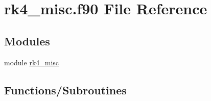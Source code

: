 \hypertarget{rk4__misc_8f90}{}\section{rk4\+\_\+misc.\+f90 File Reference}
\label{rk4__misc_8f90}
\subsection*{Modules}
\begin{DoxyCompactItemize}
\item 
module \hyperlink{namespacerk4__misc}{rk4\+\_\+misc}
\end{DoxyCompactItemize}
\subsection*{Functions/\+Subroutines}
